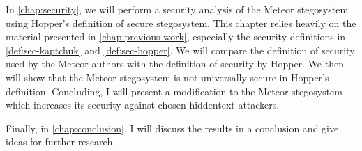 In \autoref{chap:security}, we will perform a security analysis of the Meteor stegosystem using Hopper's definition of secure stegosystem.
This chapter relies heavily on the material presented in \autoref{chap:previous-work}, especially the security definitions in \autoref{def:sec-kaptchuk} and \autoref{def:sec-hopper}.
We will compare the definition of security used by the Meteor authors with the definition of security by Hopper.
We then will show that the Meteor stegosystem is not universally secure in Hopper's definition.
Concluding, I will present a modification to the Meteor stegosystem which increases its security against chosen hiddentext attackers.

Finally, in \autoref{chap:conclusion}, I will discuss the results in a conclusion and give ideas for further research.